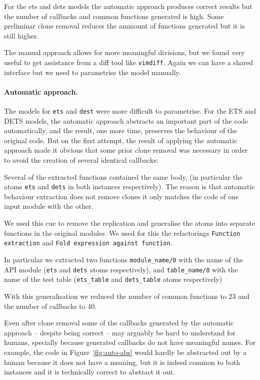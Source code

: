 For the ets and dets models the automatic approach produces correct 
results but the number of callbacks and common functions generated is 
high. Some preliminar clone removal reduces the ammount of functions 
generated but it is still higher.


The manual approach allows for more meaningful divisions, but we found 
very useful to get assistance from a diff tool like \texttt{vimdiff}. Again we 
can have a shared interface but we need to parametrise the model 
manually.

\paragraph{Automatic approach.}

The models for \texttt{ets} and \texttt{dest} were more difficult to 
parametrise. For the ETS and DETS models, the automatic approach abstracts an 
important part of the code automatically, and the result, one more time, 
preserves the behaviour of the original code. But on the first attempt, the 
result of applying the automatic approach made it obvious that some prior clone 
removal was necessary in order to avoid the creation of several identical 
callbacks:

Several of the extracted functions contained the same body, (in particular the 
atoms \texttt{ets} and \texttt{dets} in both instances respectively). The 
reason 
is that automatic behaviour extraction does not remove clones it only matches 
the code of one input module with the other.

We used this cue to remove the replication and generalise the atoms into 
separate functions in the original modules. We used for this the refactorings 
\texttt{Function extraction} and \texttt{Fold expression against function}.

In particular we extracted two functions \texttt{module\_name/0} with 
the name of the API module (\texttt{ets} and \texttt{dets} atoms respectively), 
and \texttt{table\_name/0} with the name of the test table (\texttt{ets\_table} 
and \texttt{dets\_table} atoms respectively)

With this generalisation we reduced the number of common functions to 23 and 
the number of callbacks to 40.

Even after clone removal some of the callbacks generated by the automatic 
approach -- despite being correct -- may arguably be hard to understand for 
humans, specially because generated callbacks do not have meaningful names. For 
example, the code in Figure~\ref{fig:auto-abs} would hardly be abstracted out 
by 
a human because it does not have a meaning, but it is indeed common to both 
instances and it is technically correct to abstract it out.

